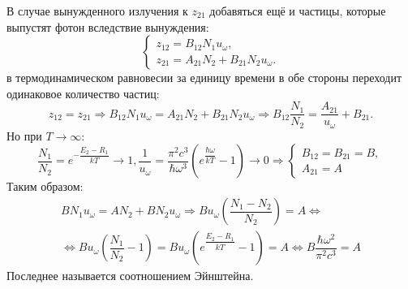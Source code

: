 В случае вынужденного излучения к $z_{21}$ добавяться ещё и частицы, которые выпустят фотон вследствие вынуждения:
\[
  \begin{cases}
    z_{12} = B_{12} N_1 u_\omega, \\
    z_{21} = A_{21} N_2 + B_{21} N_2 u_\omega.
  \end{cases}
\]
в термодинамическом равновесии за единицу времени в обе стороны переходит одинаковое количество 
частиц:
\[
  z_{12} = z_{21} \Rightarrow
  B_{12} N_1 u_\omega = A_{21} N_2 + B_{21} N_2 u_\omega
  \Rightarrow
  B_{12} \dfrac{N_1}{N_2} = \dfrac{A_{21}}{u_\omega} + B_{21}.
\]
Но при $T \to \infty$:
\[
  \dfrac{N_1}{N_2} = e^{- \dfrac{E_2-R_1}{kT}} \to 1,
  \dfrac{1}{u_\omega} = \dfrac{\pi^2 c^3}{\hbar \omega^3} \left(e^{\dfrac{\hbar \omega}{kT}} - 1\right) \to 0
  \Rightarrow
  \begin{cases}
    B_{12} = B_{21} = B, \\
    A_{21} = A 
  \end{cases}
\]
Таким образом:
\begin{multline*}
  B N_1 u_\omega = A N_2 + B N_2 u_\omega
  \Rightarrow
  B u_\omega \left( \dfrac{N_1-N_2}{N_2} \right) = A
  \Leftrightarrow \\
  \Leftrightarrow
  B u_\omega \left( \dfrac{N_1}{N_2} - 1 \right) = B u_\omega \left( e^{\dfrac{E_2-R_1}{kT}} - 1 \right) = A
  \Leftrightarrow
  B \dfrac{\hbar \omega^2}{\pi^2 c^3} = A
\end{multline*}
Последнее называется соотношением Эйнштейна.
